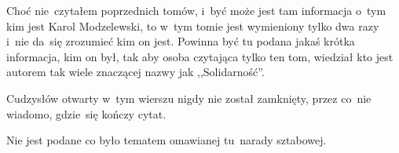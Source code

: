 \documentclass[a4paper,11pt]{article}
\begin{document}
\vspace{\spaceFour}


\start {} Choć nie~czytałem poprzednich tomów, i~być może jest
tam informacja o~tym kim jest Karol Modzelewski, to w~tym tomie jest
wymieniony tylko dwa razy i~nie da~się zrozumieć kim on jest. Powinna
być tu podana jakaś krótka informacja, kim on był, tak aby osoba
czytająca tylko ten tom, wiedział kto jest autorem tak wiele znaczącej
nazwy jak ,,Solidarność''.

\vspace{\spaceFour}


\start {} Cudzysłów otwarty w~tym wierszu nigdy nie został
zamknięty, przez co~nie wiadomo, gdzie~się kończy cytat.

\vspace{\spaceFour}


\start {} Nie jest podane co było tematem omawianej
tu~narady sztabowej.



\vspace{\spaceTwo}







\end{document}
